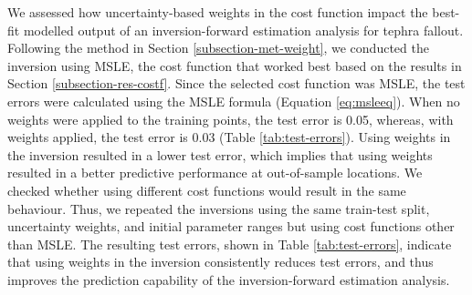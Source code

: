 We assessed how uncertainty-based weights in the cost function impact the best-fit modelled output of an inversion-forward estimation analysis for tephra fallout. Following the method in Section \ref{subsection-met-weight}, we conducted the inversion using MSLE, the cost function that worked best based on the results in Section \ref{subsection-res-costf}. Since the selected cost function was MSLE, the test errors were calculated using the MSLE formula (Equation \ref{eq:msleeq}). When no weights were applied to the training points, the test error is 0.05, whereas, with weights applied, the test error is 0.03 (Table \ref{tab:test-errors}). Using weights in the inversion resulted in a lower test error, which implies that using weights resulted in a better predictive performance at out-of-sample locations. We checked whether using different cost functions would result in the same behaviour. Thus, we repeated the inversions using the same train-test split, uncertainty weights, and initial parameter ranges but using cost functions other than MSLE. The resulting test errors, shown in Table \ref{tab:test-errors}, indicate that using weights in the inversion consistently reduces test errors, and thus improves the prediction capability of the inversion-forward estimation analysis.


